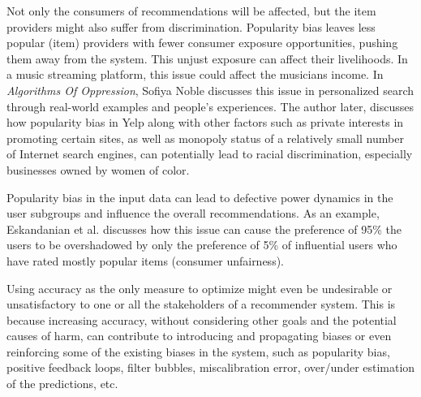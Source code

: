 Not only the consumers of recommendations will be affected, but the item providers might also suffer from discrimination. Popularity bias leaves less popular (item) providers with fewer consumer exposure opportunities, pushing them away from the system. This unjust exposure can affect their livelihoods. In a music streaming platform, this issue could affect the musicians income. In \textit{Algorithms Of Oppression}, Sofiya Noble \cite{noble2018algorithms} discusses this issue in personalized search through real-world examples and people's experiences. The author later, discusses how popularity bias in Yelp along with other factors such as private interests in promoting certain sites, as well as monopoly status of a relatively small number of Internet search engines, can potentially lead to racial discrimination, especially businesses owned by women of color.

Popularity bias in the input data can lead to defective power dynamics in the user subgroups and influence the overall recommendations. As an example, Eskandanian et al. \cite{Eskandanian2019power} discusses how this issue can cause the preference of 95\% the users to be overshadowed by only the preference of 5\% of influential users who have rated mostly popular items (consumer unfairness).

Using accuracy as the only measure to optimize might even be undesirable or unsatisfactory to one or all the stakeholders of a recommender system. This is because increasing accuracy, without considering other goals and the potential causes of harm, can contribute to introducing and propagating biases or even reinforcing some of the existing biases in the system, such as popularity bias, positive feedback loops, filter bubbles, miscalibration error, over/under estimation of the predictions, etc. 





